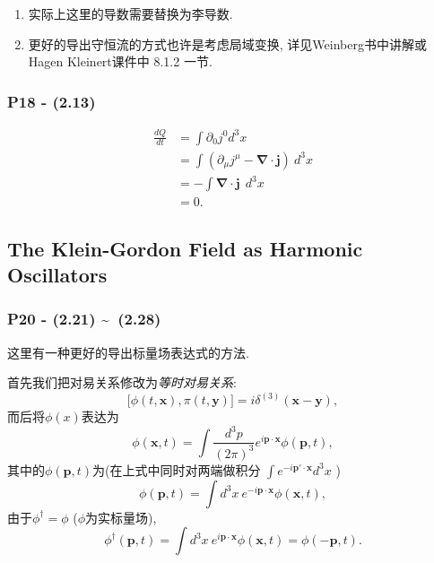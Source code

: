 \documentclass[cn,hazy,blue,11pt,device=normal,chinesefont=founder]{elegantnote}
\begin{document}
\begin{note}
  \mbox{}
  \begin{enumerate}
    \item 实际上这里的导数需要替换为李导数. 
    \item 更好的导出守恒流的方式也许是考虑局域变换, 详见Weinberg书中讲解或Hagen Kleinert课件中 8.1.2 一节. 
  \end{enumerate}
\end{note}

\subsubsection{P18 - (2.13)}
\begin{equation}
  \begin{aligned}
  \frac{dQ}{dt} &= \int \partial_0 j^0 d^3 x \\
  &= \int (\partial_\mu j^\mu - \boldsymbol{\nabla}\cdot\mathbf{j}) \ d^3 x \\
  & = - \int \boldsymbol{\nabla}\cdot\mathbf{j}\ \ d^3 x \\
  &=0.
  \end{aligned}
\end{equation}

\subsection{The Klein-Gordon Field as Harmonic Oscillators} 

\subsubsection{P20 - (2.21) \textasciitilde \ (2.28)} \label{subsubsec:KG_Field_expression}

这里有一种更好的导出标量场表达式的方法. 

首先我们把对易关系修改为\textit{等时对易关系}: 
\begin{equation}
  \bigl[\phi(t, \mathbf{x}), \pi(t, \mathbf{y})\bigr] = i\delta^{(3)}(\mathbf{x} - \mathbf{y}), 
\end{equation}
而后将$\phi(x)$表达为
\begin{equation}
  \phi(\mathbf{x}, t) = \int \frac{d^3 p}{(2\pi)^3}e^{i\mathbf{p \cdot x}}\phi(\mathbf{p}, t), 
\end{equation}
其中的$\phi(\mathbf{p}, t)$为(在上式中同时对两端做积分 $\int e^{-i\mathbf{p'\cdot x}} d^3 x$ )
\begin{equation}
  \phi(\mathbf{p}, t) = \int d^3 x\ e^{-i\mathbf{p \cdot x}}\phi(\mathbf{x}, t), 
\end{equation}
由于$\phi^\dagger = \phi$ ($\phi$为实标量场), 
\begin{equation}
  \phi^{\dagger}(\mathbf{p}, t) = \int d^3 x\ e^{i\mathbf{p \cdot x}}\phi(\mathbf{x}, t) = \phi(-\mathbf{p}, t). 
\end{equation}
\end{document}

